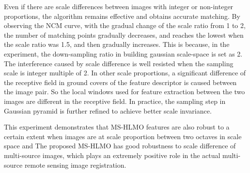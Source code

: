 Even if there are scale differences between images with integer or non-integer proportions, the algorithm remains effective and obtains accurate matching. By observing the NCM curve, with the gradual change of the scale ratio from 1 to 2, the number of matching points gradually decreases, and reaches the lowest when the scale ratio was 1.5, and then gradually increases. This is because, in the experiment, the down-sampling ratio in building gaussian scale-space is set as 2. The interference caused by scale difference is well resisted when the sampling scale is integer multiple of 2. In other scale proportions, a significant difference of the receptive field in ground covers of the feature descriptor is caused between the image pair. So the local windows used for feature extraction between the two images are different in the receptive field. In practice, the sampling step in Gaussian pyramid is further refined to achieve better scale invariance.

This experiment demonstrates that MS-HLMO features are also robust to a certain extent when images are at scale proportion between two octaves in scale space and The proposed MS-HLMO has good robustness to scale difference of multi-source images, which plays an extremely positive role in the actual multi-source remote sensing image registration.


